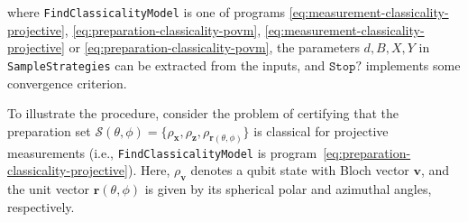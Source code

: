 	where \texttt{FindClassicalityModel} is one of programs \eqref{eq:measurement-classicality-projective}, \eqref{eq:preparation-classicality-povm}, \eqref{eq:measurement-classicality-projective} or \eqref{eq:preparation-classicality-povm}, the parameters $d, B, X, Y$ in \texttt{SampleStrategies} can be extracted from the inputs, and $\texttt{Stop?}$ implements some convergence criterion.

	To illustrate the procedure, consider the problem of certifying that the preparation set $\mathcal{S}(\theta, \phi) = \{ \rho_{\mathbf{x}}, \rho_{\mathbf{z}}, \rho_{\mathbf{r}(\theta, \phi)} \}$ is classical for projective measurements (i.e., \texttt{FindClassicalityModel} is program~\eqref{eq:preparation-classicality-projective}). Here, $\rho_{\mathbf{v}}$ denotes a qubit state with Bloch vector $\mathbf{v}$, and the unit vector $\mathbf{r}(\theta, \phi)$ is given by its spherical polar and azimuthal angles, respectively.

